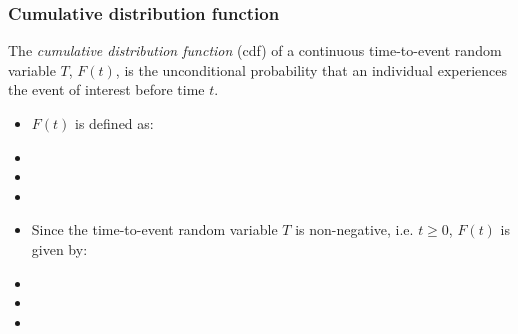 \begin{frame}
\frametitle{Cumulative distribution function}

The \emph{cumulative distribution function} (cdf) of a continuous time-to-event random variable $T$, $F(t)$, is the unconditional probability that an individual
experiences the event of interest before time $t$.
\begin{itemize}
\item $F(t)$ is defined as:
\item[]
\item[]
\item[]

\item Since the time-to-event random variable $T$ is non-negative, i.e. $t \geq 0$, $F(t)$ is given by:
\item[]
\item[]
\item[]


\end{itemize}


\end{frame}

